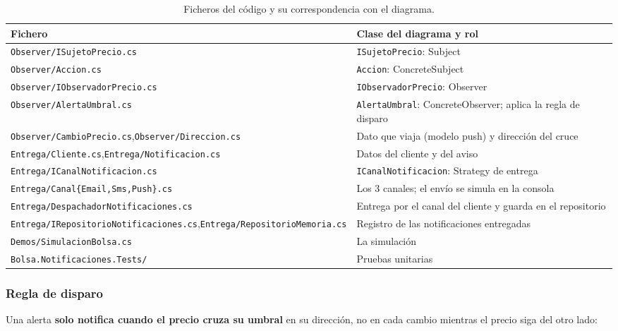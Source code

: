 \begin{table}[H]
\centering
\small
\begin{tabularx}{\textwidth}{>{\raggedright\arraybackslash}p{7.2cm} >{\raggedright\arraybackslash}X}
\toprule
\textbf{Fichero} & \textbf{Clase del diagrama y rol} \\
\midrule
\texttt{Observer/ISujetoPrecio.cs} & \texttt{ISujetoPrecio}: Subject \\
\texttt{Observer/Accion.cs} & \texttt{Accion}: ConcreteSubject \\
\texttt{Observer/IObservadorPrecio.cs} & \texttt{IObservadorPrecio}: Observer \\
\texttt{Observer/AlertaUmbral.cs} & \texttt{AlertaUmbral}: ConcreteObserver; aplica la regla de disparo \\
\texttt{Observer/CambioPrecio.cs},\newline\texttt{Observer/Direccion.cs} & Dato que viaja (modelo push) y dirección del cruce \\
\texttt{Entrega/Cliente.cs},\newline\texttt{Entrega/Notificacion.cs} & Datos del cliente y del aviso \\
\texttt{Entrega/ICanalNotificacion.cs} & \texttt{ICanalNotificacion}: Strategy de entrega \\
\texttt{Entrega/Canal\{Email,Sms,Push\}.cs} & Los 3 canales; el envío se simula en la consola \\
\texttt{Entrega/DespachadorNotificaciones.cs} & Entrega por el canal del cliente y guarda en el repositorio \\
\texttt{Entrega/IRepositorioNotificaciones.cs},\newline\texttt{Entrega/RepositorioMemoria.cs} & Registro de las notificaciones entregadas \\
\texttt{Demos/SimulacionBolsa.cs} & La simulación \\
\texttt{Bolsa.Notificaciones.Tests/} & Pruebas unitarias \\
\bottomrule
\end{tabularx}
\caption{Ficheros del código y su correspondencia con el diagrama.}
\end{table}

\subsubsection{Regla de disparo}

Una alerta \textbf{solo notifica cuando el precio cruza su umbral} en su dirección, no en
cada cambio mientras el precio siga del otro lado:


